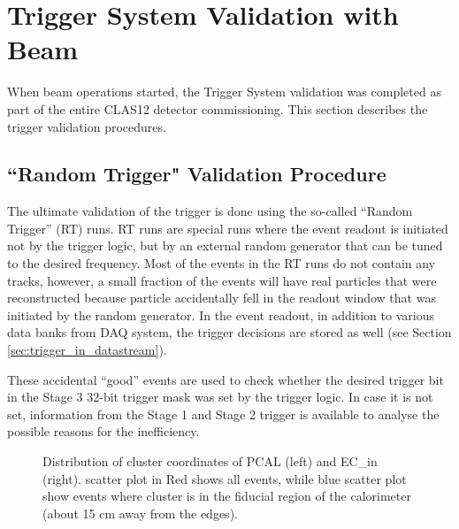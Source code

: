 \section{Trigger System Validation with Beam}
\label{sec:validation}

When beam operations started, the Trigger System validation was completed as part of the entire CLAS12 detector commissioning. This section describes the trigger validation procedures. 

\subsection{``Random Trigger" Validation Procedure}
\label{sec:validation_random}

The ultimate validation of the trigger is done using the so-called ``Random Trigger'' (RT) runs. RT runs are special runs where the event readout is initiated not by the trigger logic, but by an external random generator that can be tuned to the desired frequency. Most of the events in the RT runs do not contain any tracks, however, a small fraction of the events will have real particles that were reconstructed because particle accidentally fell in the readout window that was initiated by the random generator. In the event readout, in addition to various data banks from DAQ system, the trigger decisions are stored as well (see Section \ref{sec:trigger_in_datastream}).

These accidental ``good'' events are used to check whether the desired trigger bit in the Stage 3 32-bit trigger mask was set by the trigger logic. In case it is not set, information from the Stage 1 and Stage 2 trigger is available to analyse the possible reasons for the inefficiency.

\begin{figure}[!htb]
	\centering
	\caption{Distribution of cluster coordinates of PCAL (left) and EC\_{in} (right).
		scatter plot in Red shows all events, while blue scatter plot show events where cluster
		is in the fiducial region of the calorimeter (about 15 cm away from the edges).}
	\label{fig:pcal_clusters}
\end{figure}


